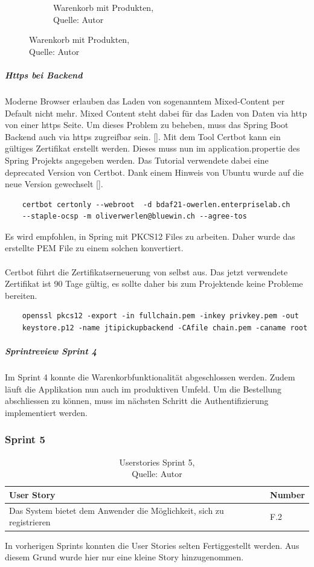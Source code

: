 \begin{figure}[h]
\begin{subfigure}[b]{0.4\textwidth}
		\caption[Warenkorb mit Produkten]{Warenkorb mit Produkten,\\ Quelle: Autor}
		\label{img: cartFull}
	\end{subfigure}
\end{figure} 

\subparagraph{Https bei Backend}
Moderne Browser erlauben das Laden von sogenanntem Mixed-Content per Default nicht mehr. Mixed Content steht dabei für das Laden von Daten via http von einer https Seite. Um dieses Problem zu beheben, muss das Spring Boot Backend auch via https zugreifbar sein.  [\cite{mixedContent}]. Mit dem Tool Certbot kann ein gültiges Zertifikat erstellt werden. Dieses muss nun im application.propertie des Spring Projekts angegeben werden. Das Tutorial verwendete dabei eine deprecated Version von Certbot. Dank einem Hinweis von Ubuntu wurde auf die neue Version gewechselt [\cite{springSSL}]. 

\begin{verbatim}
	certbot certonly --webroot  -d bdaf21-owerlen.enterpriselab.ch 
	--staple-ocsp -m oliverwerlen@bluewin.ch --agree-tos
\end{verbatim}

Es wird empfohlen, in Spring mit PKCS12 Files zu arbeiten. Daher wurde das erstellte PEM File zu einem solchen konvertiert. \\\\
Certbot führt die Zertifikatserneuerung von selbst aus. Das jetzt verwendete Zertifikat ist 90 Tage gültig, es sollte daher bis zum Projektende keine Probleme bereiten. \\

\begin{verbatim}
	openssl pkcs12 -export -in fullchain.pem -inkey privkey.pem -out 
	keystore.p12 -name jtipickupbackend -CAfile chain.pem -caname root
\end{verbatim}

\subparagraph{Sprintreview Sprint 4}
Im Sprint 4 konnte die Warenkorbfunktionalität abgeschlossen werden. Zudem läuft die Applikation nun auch im produktiven Umfeld.
Um die Bestellung abschliessen zu können, muss im nächsten Schritt die Authentifizierung implementiert werden.  

\subsubsection{Sprint 5}
\begin{table}[H]
	\begin{tabularx}{\textwidth}{|l|X|}
		\hline
		\textbf{User Story} & \textbf{Number} \\
		\hline
		Das System bietet dem Anwender die Möglichkeit, sich zu registrieren& F.2\\
		\hline
	\end{tabularx} 
	\caption[Userstories Sprint 5]{Userstories Sprint 5,\\ Quelle: Autor}
\end{table}\label{userStoriesSprint5}
 In vorherigen Sprints konnten die User Stories selten Fertiggestellt werden. Aus diesem Grund wurde hier nur eine kleine Story hinzugenommen.
 
